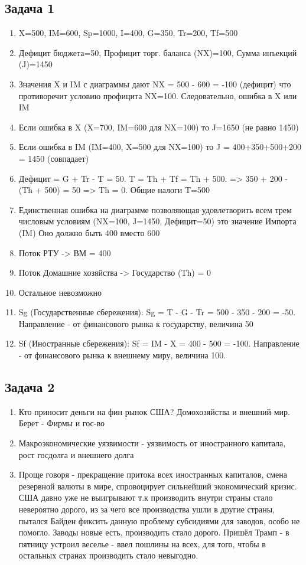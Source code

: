 \documentclass[a4paper,12pt]{article}
\begin{document}
\subsection{Задача 1}
\begin{enumerate}
    \item X=500, IM=600, Sp=1000, I=400, G=350, Tr=200, Tf=500
    \item Дефицит бюджета=50, Профицит торг. баланса (NX)=100, Сумма инъекций (J)=1450
    \item Значения X и IM с диаграммы дают NX = 500 - 600 = -100 (дефицит) что противоречит условию профицита NX=100. Следовательно, ошибка в X или IM
    \item Если ошибка в X (X=700, IM=600 для NX=100) то J=1650 (не равно 1450)
    \item Если ошибка в IM (IM=400, X=500 для NX=100) то J = 400+350+500+200 = 1450 (совпадает)
    \item Дефицит = G + Tr - T = 50. T = Th + Tf = Th + 500. => 350 + 200 - (Th + 500) = 50 => Th = 0. Общие налоги T=500
    \item Единственная ошибка на диаграмме позволяющая удовлетворить всем трем числовым условиям (NX=100, J=1450, Дефицит=50) это значение Импорта (IM) Оно должно быть 400 вместо 600
    \item Поток РТУ -> ВМ = 400
    \item Поток Домашние хозяйства -> Государство (Th) = 0
    \item Остальное невозможно
    \item Sg (Государственные сбережения): Sg = T - G - Tr = 500 - 350 - 200 = -50. Направление - от финансового рынка к государству, величина 50
    \item Sf (Иностранные сбережения): Sf = IM - X = 400 - 500 = -100. Направление - от финансового рынка к внешнему миру, величина 100.
\end{enumerate}

\subsection{Задача 2}
\begin{enumerate}
    \item Кто приносит деньги на фин рынок США? Домохозяйства и внешний мир. Берет - Фирмы и гос-во
    \item Макроэкономические уязвимости - уязвимость от иностранного капитала, рост госдолга и внешнего долга
    \item Проще говоря - прекращение притока всех иностранных капиталов, смена резервной валюты в мире, спровоцирует сильнейший экономический кризис. США давно уже не выигрывают т.к производить внутри страны стало невероятно дорого, из за чего все производства ушли в другие страны, пытался Байден фиксить данную проблему субсидиями для заводов, особо не помогло. Заводы новые есть, производить стало дорого. Пришёл Трамп - в пятницу устроил веселье - ввел пошлины на всех, для того, чтобы в остальных странах производить стало невыгодно.
\end{enumerate}
\end{document}
